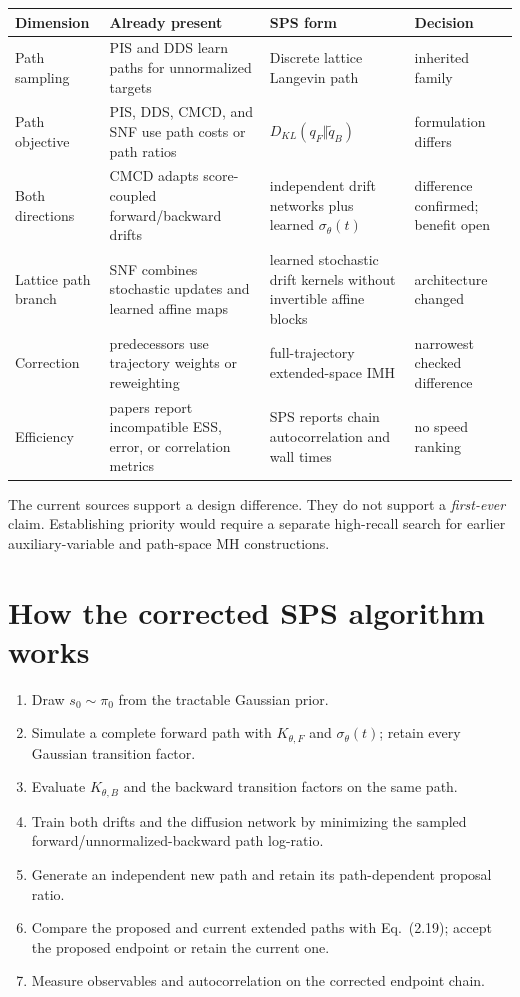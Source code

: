\documentclass[10pt]{article}
\begin{document}
\small
\begin{tabularx}{\linewidth}{@{}P{2.25cm}P{3.15cm}Y P{2.6cm}@{}}
\toprule
Dimension & Already present & SPS form & Decision \\
\midrule
Path sampling & PIS and DDS learn paths for unnormalized targets
& Discrete lattice Langevin path & inherited family \\
Path objective & PIS, DDS, CMCD, and SNF use path costs or path ratios
& $D_{KL}(q_F\Vert\widetilde q_B)$ & formulation differs \\
Both directions & CMCD adapts score-coupled forward/backward drifts
& independent drift networks plus learned $\sigma_\theta(t)$
& difference confirmed; benefit open \\
Lattice path branch & SNF combines stochastic updates and learned affine maps
& learned stochastic drift kernels without invertible affine blocks
& architecture changed \\
Correction & predecessors use trajectory weights or reweighting
& full-trajectory extended-space IMH
& narrowest checked difference \\
Efficiency & papers report incompatible ESS, error, or correlation metrics
& SPS reports chain autocorrelation and wall times
& no speed ranking \\
\bottomrule
\end{tabularx}
\normalsize

The current sources support a design difference. They do not support a
\emph{first-ever} claim. Establishing priority would require a separate
high-recall search for earlier auxiliary-variable and path-space MH
constructions.

\section{How the corrected SPS algorithm works}

\begin{enumerate}
\item Draw $s_0\sim\pi_0$ from the tractable Gaussian prior.
\item Simulate a complete forward path with $K_{\theta,F}$ and
  $\sigma_\theta(t)$; retain every Gaussian transition factor.
\item Evaluate $K_{\theta,B}$ and the backward transition factors on the same
  path.
\item Train both drifts and the diffusion network by minimizing the sampled
  forward/unnormalized-backward path log-ratio.
\item Generate an independent new path and retain its path-dependent proposal
  ratio.
\item Compare the proposed and current extended paths with Eq.~(2.19);
  accept the proposed endpoint or retain the current one.
\item Measure observables and autocorrelation on the corrected endpoint chain.
\end{enumerate}
\end{document}
